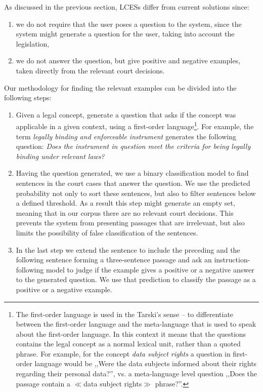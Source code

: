 As discussed in the previous section, LCESs differ from current solutions since:
\begin{enumerate}
  \item we do not require that the user poses a question to the system, since the system might generate a question for the user,
    taking into account the legislation,
  \item we do not answer the question, but give positive and negative examples, taken directly from the relevant court decisions.
\end{enumerate}

Our methodology for finding the relevant examples can be divided into the following steps:
\begin{enumerate}
  \item Given a legal concept, generate a question that asks if the concept was applicable in a given context,
    using a first-order language\footnote{The first-order language is used in the Tarski's sense -- to differentiate
    between the first-order language and the meta-language that is used to speak about the first-order language. In this 
    context it means that the questions contains the legal concept as a normal lexical unit, rather than a quoted phrase.
    For example, for the concept \textit{data subject rights} a question in first-order language would be 
      ,,Were the data subjects informed about their rights regarding their personal data?'', vs. 
      a meta-language level question ,,Does the passage contain a $\ll$data subject rights$\gg$ phrase?''.}.
    For example, the term \textit{legally binding and enforceable instrument} generates the following question:
    \textit{Does the instrument in question meet the criteria for being legally binding under relevant laws?}
  \item Having the question generated, we use a binary classification model to find sentences in the court cases that answer the question. 
    We use the predicted probability not only to sort these sentences, but also to filter sentences below a defined threshold.
    As a result this step might generate an empty set, meaning that in our corpus there are no relevant court decisions. 
    This prevents the system from presenting passages that are irrelevant, but also limits the possibility of false
    classification of the sentences.
  \item In the last step we extend the sentence to include the preceding and the following sentence forming a three-sentence passage
    and ask an instruction-following model to judge if the example gives a positive or a negative answer to the generated question.
    We use that prediction to classify the passage as a positive or a negative example.
\end{enumerate}


